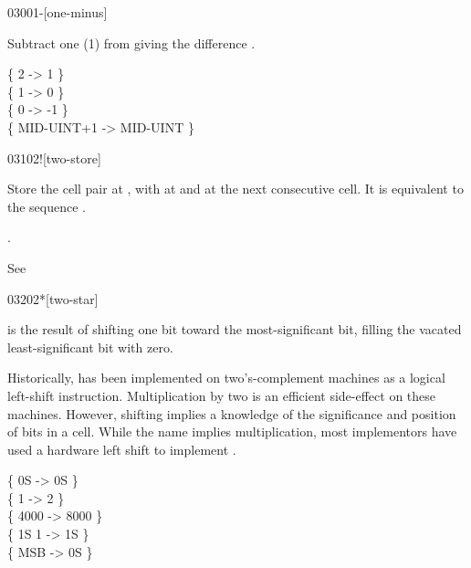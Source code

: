 \begin{worddef}{0300}{1-}[one-minus]
\item {}

	Subtract one (1) from  giving the difference
	.

	\begin{defer}
	\testing
		\{          2  ->        1 \} \\
		\{          1  ->        0 \} \\
		\{          0  ->       -1 \} \\
		\{ MID-UINT+1  -> MID-UINT \}
	\end{defer}
\end{worddef}


\begin{worddef}{0310}{2!}[two-store]
\item {}

	Store the cell pair  at , with
	 at  and  at the next
	consecutive cell. It is equivalent to the sequence
	  \word{!}  \word{!}.

\see {}.

	\begin{defer}
	\testing*
		See \rref{core:,}{,}
	\end{defer}
\end{worddef}


\begin{worddef}{0320}{2*}[two-star]
\item {}

	 is the result of shifting  one bit toward
	the most-significant bit, filling the vacated least-significant
	bit with zero.

	\begin{defer}
	\rationale %
		Historically,  has been implemented on
		two's-complement machines as a logical left-shift instruction.
		Multiplication by two is an efficient side-effect on these
		machines. However, shifting implies a knowledge of the
		significance and position of bits in a cell. While the name
		implies multiplication, most implementors have used a hardware
		left shift to implement \word{2*}.

	\testing
		\{ 0S	 -> 0S \} \\
		\{ 1	 -> 2 \} \\
		\{ 4000  -> 8000 \} \\
		\{ 1S	 1  -> 1S \} \\
		\{ MSB	 -> 0S \}
	\end{defer}
\end{worddef}


